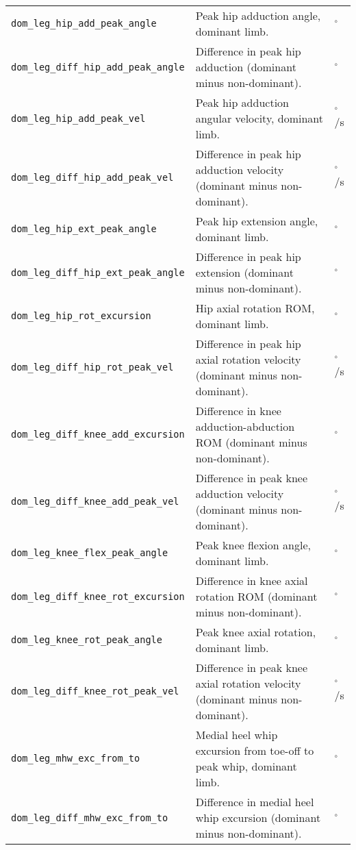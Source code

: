{\begin{longtable}{@{}p{} p{} p{}@{}}
    \texttt{dom\_leg\_hip\_add\_peak\_angle} & Peak hip adduction angle, dominant limb. & $^\circ$ \\
    \texttt{dom\_leg\_diff\_hip\_add\_peak\_angle} & Difference in peak hip adduction (dominant minus non-dominant). & $^\circ$ \\
    \texttt{dom\_leg\_hip\_add\_peak\_vel} & Peak hip adduction angular velocity, dominant limb. & $^\circ$/s \\
    \texttt{dom\_leg\_diff\_hip\_add\_peak\_vel} & Difference in peak hip adduction velocity (dominant minus non-dominant). & $^\circ$/s \\
    \texttt{dom\_leg\_hip\_ext\_peak\_angle} & Peak hip extension angle, dominant limb. & $^\circ$ \\
    \texttt{dom\_leg\_diff\_hip\_ext\_peak\_angle} & Difference in peak hip extension (dominant minus non-dominant). & $^\circ$ \\
    \texttt{dom\_leg\_hip\_rot\_excursion} & Hip axial rotation ROM, dominant limb. & $^\circ$ \\
    \texttt{dom\_leg\_diff\_hip\_rot\_peak\_vel} & Difference in peak hip axial rotation velocity (dominant minus non-dominant). & $^\circ$/s \\
    \texttt{dom\_leg\_diff\_knee\_add\_excursion} & Difference in knee adduction-abduction ROM (dominant minus non-dominant). & $^\circ$ \\
    \texttt{dom\_leg\_diff\_knee\_add\_peak\_vel} & Difference in peak knee adduction velocity (dominant minus non-dominant). & $^\circ$/s \\
    \texttt{dom\_leg\_knee\_flex\_peak\_angle} & Peak knee flexion angle, dominant limb. & $^\circ$ \\
    \texttt{dom\_leg\_diff\_knee\_rot\_excursion} & Difference in knee axial rotation ROM (dominant minus non-dominant). & $^\circ$ \\
    \texttt{dom\_leg\_knee\_rot\_peak\_angle} & Peak knee axial rotation, dominant limb. & $^\circ$ \\
    \texttt{dom\_leg\_diff\_knee\_rot\_peak\_vel} & Difference in peak knee axial rotation velocity (dominant minus non-dominant). & $^\circ$/s \\
    \texttt{dom\_leg\_mhw\_exc\_from\_to} & Medial heel whip excursion from toe-off to peak whip, dominant limb. & $^\circ$ \\
    \texttt{dom\_leg\_diff\_mhw\_exc\_from\_to} & Difference in medial heel whip excursion (dominant minus non-dominant). & $^\circ$ \\

\end{longtable}}
